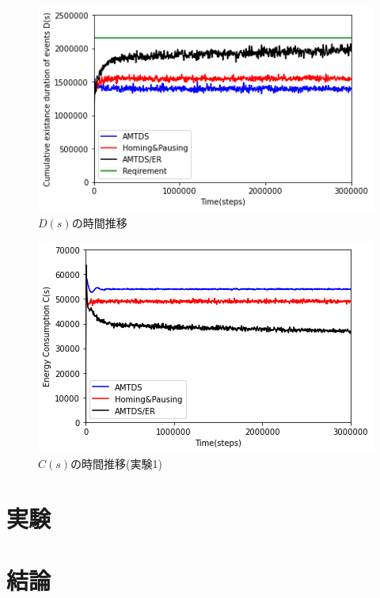 \documentclass[11pt,a4j,twocolumn]{jarticle}
\begin{document}
\begin{figure}
  \centering
  \includegraphics[width=0.8\hsize]{figures/ds_graph_3600_ave_ER_Office_600.png}
  \caption{$D(s)$の時間推移}
  \label{fig:ds_ER_Office}
\end{figure}

\begin{figure}
  \centering
  \includegraphics[width=0.8\hsize]{figures/cs_graph_3600_ave_ER_Office_600.png}
  \caption{$C(s)$の時間推移(実験1)}
  \label{fig:cs_ER_Office}
\end{figure}

\section{実験}
\section{結論}



\end{document}
